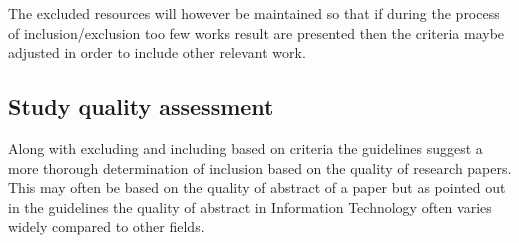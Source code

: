 \noindent
The excluded resources will however be maintained so that if during the process of inclusion/exclusion too few works result are presented then the criteria maybe adjusted in order to include other relevant work.  

\subsection{Study quality assessment}

Along with excluding and including based on criteria the guidelines suggest a more thorough determination of inclusion based on the quality of research papers. This may often be based on the quality of abstract of a paper but as pointed out in the guidelines the quality of abstract in Information Technology often varies widely compared to other fields. 








 
 

